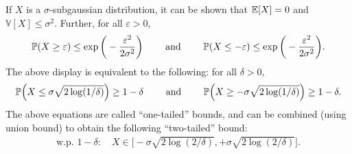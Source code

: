 \documentclass[twoside]{article}
\newcommand{\VV}[1]{\mathbb{V}[#1]}
\begin{document}
    If $X$ is a $\sigma$-subgaussian distribution, it can be shown that $\mathbb{E}[X] = 0$ and $\VV{X} \leq \sigma^2$. Further, for all $\varepsilon > 0$,
    \begin{align*}
      \mathbb{P}(X \geq \varepsilon) \leq \exp \bigg( -\frac{\varepsilon^2}{2 \sigma^2} \bigg) \qquad \text{ and } \qquad \mathbb{P}(X \leq - \varepsilon) \leq \exp \bigg( -\frac{\varepsilon^2}{2 \sigma^2} \bigg).
    \end{align*}
    The above display is equivalent to the following: for all $\delta > 0$,
    \begin{align*}
      \mathbb{P} \Big(X \leq \sigma \sqrt{2 \log (1 / \delta)} \Big) \geq 1 - \delta \qquad \text{ and } \qquad \mathbb{P} \Big(X \geq - \sigma \sqrt{2 \log (1 / \delta)} \Big) \geq 1 - \delta.
    \end{align*}
    The above equations are called ``one-tailed'' bounds, and can be combined (using union bound) to obtain the following ``two-tailed'' bound: 
    \begin{align}
      \text{w.p. } 1 - \delta: \quad X \in \Big[ - \sigma \sqrt{2 \log (2 / \delta)}, + \sigma \sqrt{2 \log (2 / \delta)} \Big]. \label{eq: two_tailed_SG}
    \end{align}
    
\end{document}
